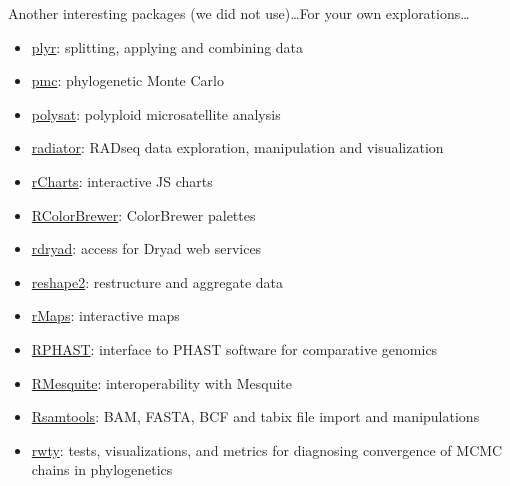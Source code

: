 \documentclass[compress, xelatex, 11pt, xcolor=svgnames, aspectratio=169,
	hyperref={
		bookmarks=true,
		unicode=true,
		colorlinks=true,
		pdftitle={Molecular data in R},
		plainpages=false,
		pdfauthor={Vojtech Zeisek},
		pdfsubject={Course about phylogeny and evolution in R},
		pdfcreator={XeLaTeX},
		pdfkeywords={R, evolution, phylogeny, molecular data},
		linkcolor=Crimson, %
		anchorcolor=Magenta, %
		citecolor=Magenta, %
		filecolor=Magenta, %
		menucolor=Magenta, %
		urlcolor=DodgerBlue, %
		},
	url={hyphens, lowtilde} %
	]{beamer}
\begin{document}
\begin{frame}[allowframebreaks]{Another interesting packages (we did not use)\ldots}{For your own explorations\ldots}
\begin{itemize}
		\item \href{https://CRAN.R-project.org/package=plyr}{plyr}: splitting, applying and combining data
		\item \href{https://CRAN.R-project.org/package=pmc}{pmc}: phylogenetic Monte Carlo
		\item \href{https://CRAN.R-project.org/package=polysat}{polysat}: polyploid microsatellite analysis
		\item \href{https://github.com/thierrygosselin/radiator}{radiator}: RADseq data exploration, manipulation and visualization
		\item \href{https://github.com/ramnathv/rCharts}{rCharts}: interactive JS charts
		\item \href{https://CRAN.R-project.org/package=RColorBrewer}{RColorBrewer}: ColorBrewer palettes
		\item \href{https://CRAN.R-project.org/package=rdryad}{rdryad}: access for Dryad web services
		\item \href{https://CRAN.R-project.org/package=reshape2}{reshape2}: restructure and aggregate data
		\item \href{https://github.com/ramnathv/rMaps}{rMaps}: interactive maps
		\item \href{https://github.com/CshlSiepelLab/RPHAST}{RPHAST}: interface to PHAST software for comparative genomics
		\item \href{https://r-forge.r-project.org/projects/rmesquite/}{RMesquite}: interoperability with Mesquite
		\item \href{https://bioconductor.org/packages/release/bioc/html/Rsamtools.html}{Rsamtools}: BAM, FASTA, BCF and tabix file import and manipulations
		\item \href{https://CRAN.R-project.org/package=rwty}{rwty}: tests, visualizations, and metrics for diagnosing convergence of MCMC chains in phylogenetics

\end{itemize}
\end{frame}
\end{document}
